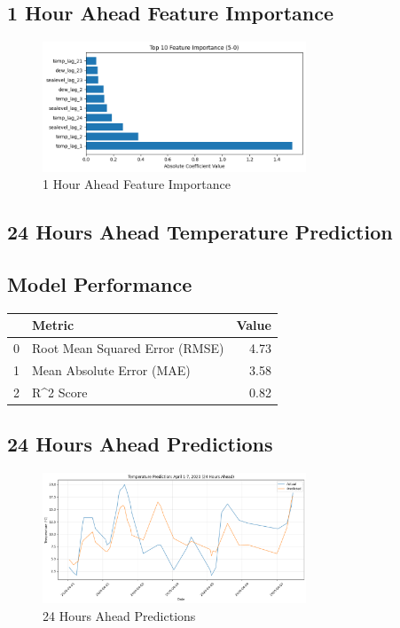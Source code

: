 \subsection{1 Hour Ahead Feature Importance}
\begin{figure}[htbp]
\centering
\includegraphics[width=0.7\textwidth]{5-0-linear_temp_feature_importance.png}
\caption{1 Hour Ahead Feature Importance}
\label{fig:1_hour_ahead_featimp}
\end{figure}



\subsection{24 Hours Ahead Temperature Prediction}
\subsection{Model Performance}
\begin{tabular}{llr}
\toprule
 & Metric & Value \\
\midrule
0 & Root Mean Squared Error (RMSE) & 4.73 \\
1 & Mean Absolute Error (MAE) & 3.58 \\
2 & R^2 Score & 0.82 \\
\bottomrule
\end{tabular}

\subsection{24 Hours Ahead Predictions}
\begin{figure}[htbp]
\centering
\includegraphics[width=0.7\textwidth]{5-1-linear_temp_prediction_results.png}
\caption{24 Hours Ahead Predictions}
\label{fig:24_hours_ahead_pred}
\end{figure}

